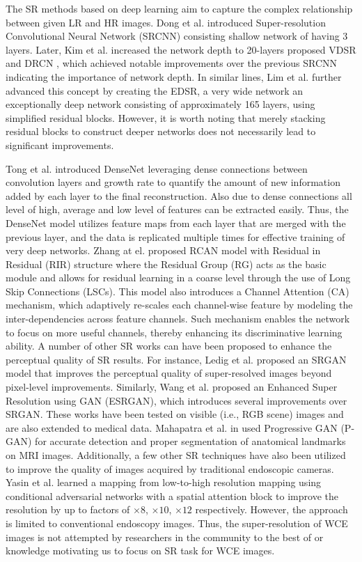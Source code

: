 \documentclass[conference]{IEEEtran}
\begin{document}
The SR methods based on deep learning aim to capture the complex relationship between given LR and HR images. Dong et al. \cite{SRCNN} introduced Super-resolution Convolutional Neural Network (SRCNN) consisting shallow network of having 3 layers. Later, Kim et al. increased the network depth to 20-layers proposed VDSR \cite{VDSR} and DRCN \cite{DRCN}, which achieved notable improvements over the previous SRCNN indicating the importance of network depth. In similar lines, Lim et al.\cite{EDSR} further advanced this concept by creating the EDSR, a very wide network an exceptionally deep network consisting of approximately 165 layers, using simplified residual blocks. However, it is worth noting that merely stacking residual blocks to construct deeper networks does not necessarily lead to significant improvements. 

Tong et al. introduced DenseNet \cite{SRDensenet} leveraging dense connections between convolution layers and growth rate to quantify the amount of new information added by each layer to the final reconstruction. Also due to dense connections all level of high, average and low level of features can be extracted easily. Thus, the DenseNet model utilizes feature maps from each layer that are merged with the previous layer, and the data is replicated multiple times for effective training of very deep networks. Zhang at el. proposed RCAN \cite{RCAN} model with Residual in Residual (RIR) structure where the Residual Group (RG) acts as the basic module and allows for residual learning in a coarse level through the use of Long Skip Connections (LSCs). This model also introduces a Channel Attention (CA) mechanism, which adaptively re-scales each channel-wise feature by modeling the inter-dependencies across feature channels. Such mechanism enables the network to focus on more useful channels, thereby enhancing its discriminative learning ability. A number of other SR works can have been proposed to enhance the perceptual quality of SR results. For instance, Ledig et al. \cite{SRGAN} proposed an SRGAN model that improves the perceptual quality of super-resolved images beyond pixel-level improvements. Similarly, Wang et al. \cite{ESRGAN} proposed an Enhanced Super Resolution using GAN (ESRGAN), which introduces several improvements over SRGAN. These works have been tested on visible (i.e., RGB scene) images and are also extended to medical data. Mahapatra et al. in \cite{L10} used Progressive GAN (P-GAN) for accurate detection and proper segmentation of anatomical landmarks on MRI images. Additionally, a few other SR techniques have also been utilized to improve the quality of images acquired by traditional endoscopic cameras. Yasin et al. \cite{EndoL2H} learned a mapping from low-to-high resolution mapping using conditional adversarial networks with a spatial attention block to improve the resolution by up to factors of $\times 8$, $\times 10$, $\times 12$ respectively. However, the approach is limited to conventional endoscopy images. Thus, the super-resolution of WCE images is not attempted by researchers in the community to the best of or knowledge motivating us to focus on SR task for WCE images.
\end{document}
